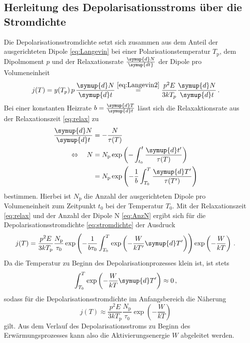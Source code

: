 \subsection*{Herleitung des Depolarisationsstroms über die Stromdichte}
Die Depolarisationsstromdichte setzt sich zusammen aus dem Anteil der ausgerichteten Dipole \eqref{eq:Langevin} bei einer Polarisationstemperatur $T_\text{p}$, dem Dipolmoment $p$ und der Relaxationsrate $\frac{\symup{d}N}{\symup{dt}}$ der Dipole pro Volumeneinheit
\begin{equation}\label{eq:stromdichte}
    j(T)=y(T_p)\,p\,\frac{\symup{d}N}{\symup{d}t} \stackrel{\eqref{eq:Langevin2}}{=} \frac{p^2 E}{3kT_p}\frac{\symup{d}N}{\symup{d}t} \, .
\end{equation}
Bei einer konstanten Heizrate $b = \frac{\symup{d}T}{\symup{d}t}$ lässt sich die Relaxaktionsrate aus der Relaxationszeit \eqref{eq:relax} zu
\begin{align}
    \frac{\symup{d}N}{\symup{d}t} & = -\frac{N}{\tau(T)}\notag \\
    \Leftrightarrow \quad N & = N_\text{p}\exp\left(-\int_{t_0}^t \frac{\symup{d}t'}{\tau(T)}\right)\notag \\
    & = N_\text{p}\exp\left(-\frac{1}{b}\int_{T_0}^T \frac{\symup{d}T'}{\tau(T')}\right)\label{eq:AnzN}
\end{align}
bestimmen.
Hierbei ist $N_\text{p}$ die Anzahl der ausgerichteten Dipole pro Volumeneinheit zum Zeitpunkt $t_0$ bei der Temperatur $T_0$.
Mit der Relaxationszeit \eqref{eq:relax} und der Anzahl der Dipole N \eqref{eq:AnzN} ergibt sich für die Depolarisationsstromdichte \eqref{eq:stromdichte} der Ausdruck
\begin{equation}\label{eq:stromdichte2}
    j(T)= \frac{p^2E}{3kT_\text{p}}\frac{N_\text{p}}{\tau_0}\exp\left(-\frac{1}{b\tau_0}\int_{T_0}^T \exp\left(-\frac{W}{kT'}\symup{d}T'\right) \right)\exp\left(-\frac{W}{kT}\right)\, .
\end{equation}
Da die Temperatur zu Beginn des Depolarisationprozesses klein ist, ist stets
\begin{equation*}
    \int_{T_0}^T \exp\left(-\frac{W}{kT}\symup{d}T' \right) \approx 0\, ,
\end{equation*}
sodass für die Depolarisationsstromdichte im Anfangsbereich die Näherung
\begin{equation}
    j(T)\approx    \frac{p^2 E}{3kT_\text{p}}\frac{N_\text{p}}{\tau_0}\exp\left(-\frac{W}{kT}\right)
    \label{eq:anlauf}
\end{equation}
gilt.
Aus dem Verlauf des Depolarisationsstroms zu Beginn des Erwärmungsprozesses kann also die Aktivierungsenergie $W$ abgeleitet werden.

